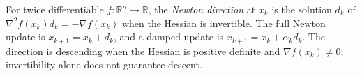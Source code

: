 
For twice differentiable $f:\mathbb R^n\to\mathbb R$, the \emph{Newton direction} at $x_k$ is the solution $d_k$ of $\nabla^2f(x_k)d_k=-\nabla f(x_k)$ when the Hessian is invertible. The full Newton update is $x_{k+1}=x_k+d_k$, and a damped update is $x_{k+1}=x_k+\alpha_k d_k$. The direction is descending when the Hessian is positive definite and $\nabla f(x_k)\ne0$; invertibility alone does not guarantee descent.
